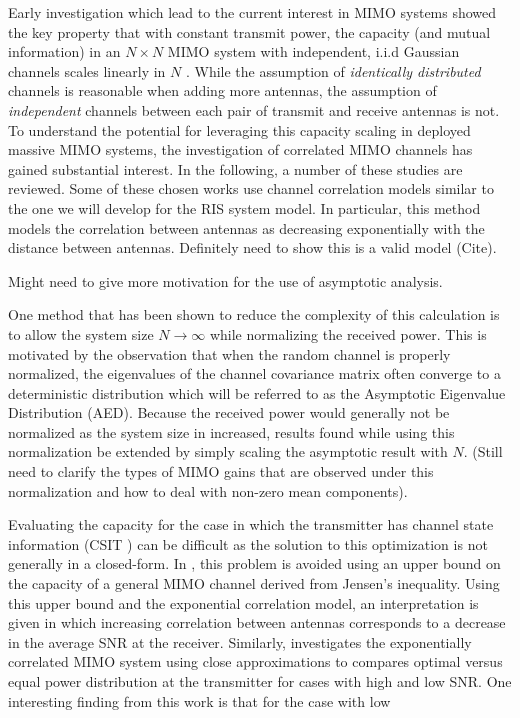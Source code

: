 \par
Early investigation which lead to the current interest in MIMO systems showed the key property that with constant transmit power, the capacity (and mutual information) in an $N \times N$ MIMO system with independent, i.i.d Gaussian channels scales linearly in $N$ \cite{foschini1998limits}. While the assumption of \emph{identically distributed} channels is reasonable when adding more antennas, the assumption of \emph{independent} channels between each pair of transmit and receive antennas is not. To understand the potential for leveraging this capacity scaling in deployed massive MIMO systems, the investigation of correlated MIMO channels has gained substantial interest. In the following, a number of these studies are reviewed. Some of these chosen works use channel correlation models similar to the one we will develop for the RIS system model. In particular, this method models the correlation between antennas as decreasing  exponentially with the distance between antennas. Definitely need to show this is a valid model (Cite).
\par
Might need to give more motivation for the use of asymptotic analysis.
\par
One method that has been shown to reduce the complexity of this calculation is to allow the system size $N \rightarrow \infty$ while normalizing the received power. 
This is motivated by the observation that when the random channel is properly normalized, the eigenvalues of the channel covariance matrix often converge to a deterministic distribution which will be referred to as the Asymptotic Eigenvalue Distribution (AED). 
Because the received power would generally not be normalized as the system size in increased, results found while using this normalization be extended by simply scaling the asymptotic result with $N$.
(Still need to clarify the types of MIMO gains that are observed under this normalization and how to deal with non-zero mean components).
\par
Evaluating the capacity for the case in which the transmitter has channel state information (CSIT ) can be difficult as the solution to this optimization is not generally in a closed-form. In \cite{loyka2001channel}, this problem is avoided using an upper bound on the capacity of a general MIMO channel derived from Jensen's inequality. Using this upper bound and the exponential correlation model, an interpretation is given in which increasing correlation between antennas corresponds to a decrease in the average SNR at the receiver. 
Similarly, \cite{chuah2002capacity} investigates the exponentially correlated MIMO system using close approximations to compares optimal versus equal power distribution at the transmitter for cases with high and low SNR. One interesting finding from this work is that for the case with low

